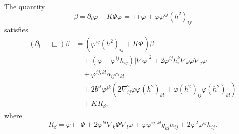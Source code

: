 \documentclass[12pt]{amsart}
\begin{document}
\begin{lemma}
\label{lem:evbeta}
The quantity
\[
\beta = \partial_t \varphi - K\Phi\varphi = \Box\varphi +  \varphi\varphi^{ij} (h^2)_{ij}
\]
satisfies
\[
\begin{split}
(\partial_{t} - \Box)\beta &= \left(\varphi^{ij}(h^2)_{ij} + K\Phi \right)\beta \\
&\quad + (\varphi - \varphi^{ij}h_{ij}) |\nabla\varphi|^{2} + 2\varphi^{ij}h^{k}_{i}\nabla_k \varphi \nabla_j \varphi \\
&\quad + \varphi^{ij,kl} \alpha_{ij} \alpha_{kl} \\
&\quad + 2b^{il}\varphi^{jk} (2\nabla^2_{ij}\varphi\varphi(h^2)_{kl} + \varphi(h^2)_{ij}\varphi(h^2)_{kl}) \\
&\quad + KR_{\beta},
\end{split}
\]
where
\[
R_{\beta} = \varphi \Box \Phi + 2\varphi^{kl} \nabla_k \Phi \nabla_l \varphi + \varphi \varphi^{ij,kl}g_{kl} \alpha_{ij} + 2\varphi^{2}\varphi^{ij}h_{ij}.
\]
\end{lemma}
\end{document}
